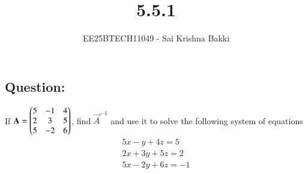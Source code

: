 \documentclass[journal]{IEEEtran}
\begin{document}


\title{5.5.1}
\author{EE25BTECH11049 - Sai Krishna Bakki}
\maketitle

\subsection*{Question: } 
If $\mathbf{A}=\begin{pmatrix}5&-1&4\\2&3&5\\5&-2&6\end{pmatrix}$, find $\vec{A}^{-1}$ and use it to solve the following system of equations
\begin{align*}
    5x-y+4z=5\\
    2x+3y+5z=2\\
    5x-2y+6z=-1
\end{align*}
\end{document}

